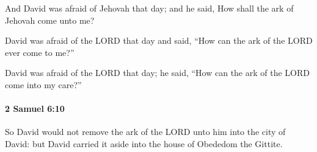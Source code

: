 			\begin{versebox}
					\item[BHS] 
					\item[ASV] And David was afraid of Jehovah that day; and he said, How shall the ark of Jehovah come unto me?
					\item[NIV] David was afraid of the LORD that day and said, “How can the ark of the LORD ever come to me?”
					\item[NRSV] David was afraid of the LORD that day; he said, “How can the ark of the LORD come into my care?”
			\end{versebox}

		\paragraph{2 Samuel 6:10} %
			\label{2SAMUEL-6-10}

			So David would not remove the ark of the LORD unto him into the city of David: but David carried it aside into the house of Obededom the Gittite.

